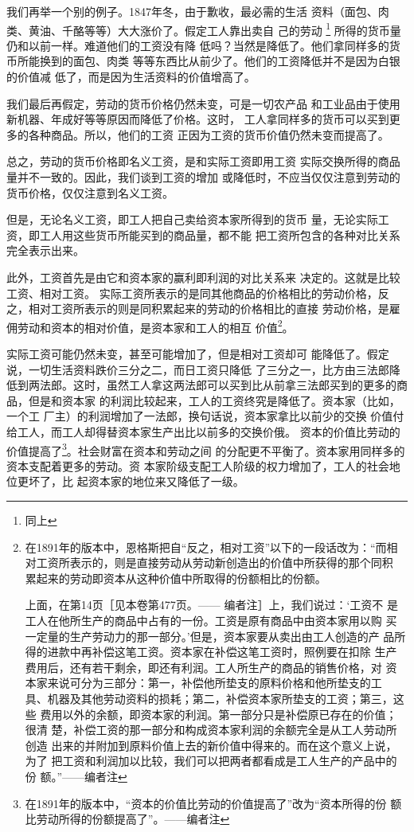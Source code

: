 \documentclass[a4paper,twoside,12pt,AutoFakeBold]{ctexart}
\begin{document}
我们再举一个别的例子。1847年冬，由于歉收，最必需的生活
资料（面包、肉类、黄油、千酪等等）大大涨价了。假定工人靠出卖自
己的劳动 \footnote{同上} 所得的货币量仍和以前一样。难道他们的工资没有降
低吗？当然是降低了。他们拿同样多的货币所能换到的面包、肉类
等等东西比从前少了。他们的工资降低并不是因为白银的价值减
低了，而是因为生活资料的价值增高了。

我们最后再假定，劳动的货币价格仍然未变，可是一切农产品
和工业品由于使用新机器、年成好等等原因而降低了价格。这时，
工人拿同样多的货币可以买到更多的各种商品。所以，他们的工资
正因为工资的货币价值仍然未变而提高了。

总之，劳动的货币价格即名义工资，是和实际工资即用工资
实际交换所得的商品量并不一致的。因此，我们谈到工资的增加
或降低时，不应当仅仅注意到劳动的货币价格，仅仅注意到名义工资。

但是，无论名义工资，即工人把自己卖给资本家所得到的货币
量，无论实际工资，即工人用这些货币所能买到的商品量，都不能
把工资所包含的各种对比关系完全表示出来。

此外，工资首先是由它和资本家的赢利即利润的对比关系来
决定的。这就是比较工资、相对工资。
实际工资所表示的是同其他商品的价格相比的劳动价格，反
之，相对工资所表示的则是同积累起来的劳动的价格相比的直接
劳动价格，是雇佣劳动和资本的相对价值，是资本家和工人的相互
价值\footnote{在1891年的版本中，恩格斯把自“反之，相对工资”以下的一段话改为：“而相
对工资所表示的，则是直接劳动从劳动新创造出的价值中所获得的那个同积
累起来的劳动即资本从这种价值中所取得的份额相比的份额。

上面，在第14页［见本卷第477页。—— 编者注］上，我们说过：‘工资不
是工人在他所生产的商品中占有的一份。工资是原有商品中由资本家用以购
买一定量的生产劳动力的那一部分。’但是，资本家要从卖出由工人创造的产
品所得的进款中再补偿这笔工资。资本家在补偿这笔工资时，照例要在扣除
生产费用后，还有若干剩余，即还有利润。工人所生产的商品的销售价格，对
资本家来说可分为三部分：第一，补偿他所垫支的原料价格和他所垫支的工
具、机器及其他劳动资料的损耗；第二，补偿资本家所垫支的工资；第三，这些
费用以外的余额，即资本家的利润。第一部分只是补偿原已存在的价值；很清
楚，补偿工资的那一部分和构成资本家利润的余额完全是从工人劳动所创造
出来的并附加到原料价值上去的新价值中得来的。而在这个意义上说，为了
把工资和利润加以比较，我们可以把两者都看成是工人生产的产品中的份
额。”——编者注}。

实际工资可能仍然未变，甚至可能增加了，但是相对工资却可
能降低了。假定说，一切生活资料跌价三分之二，而日工资只降低
了三分之一，比方由三法郎降低到两法郎。这时，虽然工人拿这两法郎可以买到比从前拿三法郎买到的更多的商品，但是和资本家
的利润比较起来，工人的工资终究是降低了。资本家（比如，一个工
厂主）的利润增加了一法郎，换句话说，资本家拿比以前少的交换
价值付给工人，而工人却得替资本家生产出比以前多的交换价俄。
资本的价值比劳动的价值提高了\footnote{在1891年的版本中，“资本的价值比劳动的价值提高了”改为“资本所得的份
额比劳动所得的份额提高了”。——编者注}。社会财富在资本和劳动之间
的分配更不平衡了。资本家用同样多的资本支配着更多的劳动。资
本家阶级支配工人阶级的权力增加了，工人的社会地位更坏了，比
起资本家的地位来又降低了一级。
\end{document}
